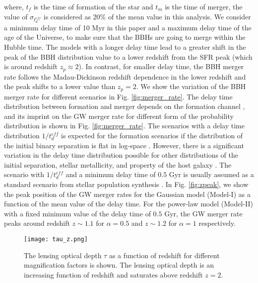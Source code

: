 \documentclass[a4paper,useAMS,usenatbib]{mnras}
\begin{document}
where, $t_f$ is the time of formation of the star and $t_m$ is the time of merger, the value of $\sigma_{t^{eff}_d}$ is considered as $20\%$ of the mean value in this analysis. We consider a minimum delay time of 10 Myr in this paper and a maximum delay time of the age of the Universe, to make sure that the BBHs are going to merge within the Hubble time. The models with a longer delay time lead to a greater shift in the peak of the BBH distribution value to a lower redshift from the SFR peak (which is around redshift $z_p\approx 2$). In contrast, for smaller delay time, the BBH merger rate follows the Madau-Dickinson redshift dependence in the lower redshift and the peak shifts to a lower value than $z_p=2$. We show the variation of the BBH merger rate for different scenarios in Fig. \ref{fig:merger_rate}. {The  delay time distribution between formation and merger depends on the formation channel \citep{2010ApJ...716..615O,2010MNRAS.402..371B, 2012ApJ...759...52D, Dominik:2014yma, 2016MNRAS.458.2634M, Lamberts:2016txh, 2018MNRAS.474.4997C, Elbert:2017sbr, Eldridge:2018nop, Vitale:2018yhm, Buisson:2020hoq,Santoliquido:2020axb}, and its imprint on the GW merger rate for different form of the probability distribution is shown in Fig. \ref{fig:merger_rate}. The scenarios with a delay time distribution $1/t_{d}^{eff}$ is expected for the formation scenarios if the distribution of the initial binary separation is flat in %
log-space \citep{2010ApJ...716..615O, 2012ApJ...759...52D}. However, there is a significant variation in the delay time distribution %
possible for other distributions of the initial separation, stellar metallicity, and property of the host galaxy \citep{Lamberts:2016txh, 2018MNRAS.474.4997C, Elbert:2017sbr, Eldridge:2018nop, Vitale:2018yhm, Buisson:2020hoq,Santoliquido:2020axb}. The scenario with $1/t_{d}^{eff}$ and a minimum delay time of $0.5$ Gyr is usually assumed as a standard scenario from stellar population synthesis \citep{2010ApJ...716..615O,2010MNRAS.402..371B, 2012ApJ...759...52D}.} In Fig. \ref{fig:zpeak}, we show the peak position of the GW merger rates for the Gaussian model (Model-I) as a function of the mean value of the delay time. For the power-law model (Model-II) with a fixed minimum value of the delay time of $0.5$ Gyr, the GW merger rate peaks around redshift $z\sim 1.1$ for $\alpha=0.5$ and $z\sim 1.2$ for $\alpha=1$ respectively. 

\begin{figure*}
    \centering
    \texttt{[image: tau\_z.png]}
    \caption{The lensing optical depth $\tau$ as a function of redshift for different magnification factors is shown. The lensing optical depth is an increasing function of redshift and saturates above redshift $z=2$.}
    \label{fig:tauz}
\end{figure*}
\end{document}
